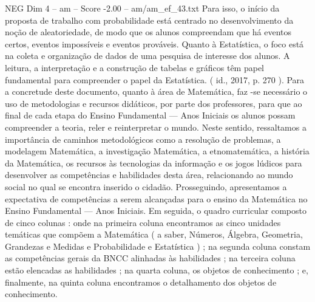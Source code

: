 \begin{textsample}{NEG Dim 4 – am – Score -2.00 – am/am\_ef\_43.txt}
Para isso, o início da proposta de trabalho com probabilidade está centrado no desenvolvimento da noção de aleatoriedade, de modo que os alunos compreendam que há eventos certos, eventos impossíveis e eventos prováveis.
Quanto à Estatística, o foco está na coleta e organização de dados de uma pesquisa de interesse dos alunos.
A leitura, a interpretação e a construção de tabelas e gráficos têm papel fundamental para compreender o papel da Estatística. ( id., 2017, p. 270 ).
Para a concretude deste documento, quanto à área de Matemática, faz -se necessário o uso de metodologias e recursos didáticos, por parte dos professores, para que ao final de cada etapa do Ensino Fundamental — Anos Iniciais os alunos possam compreender a teoria, reler e reinterpretar o mundo.
Neste sentido, ressaltamos a importância de caminhos metodológicos como a resolução de problemas, a modelagem Matemática, a investigação Matemática, a etnomatemática, a história da Matemática, os recursos às tecnologias da informação e os jogos lúdicos para desenvolver as competências e habilidades desta área, relacionando ao mundo social no qual se encontra inserido o cidadão.
Prosseguindo, apresentamos a expectativa de competências a serem alcançadas para o ensino da Matemática no Ensino Fundamental — Anos Iniciais.
Em seguida, o quadro curricular composto de cinco colunas : onde na primeira coluna encontramos as cinco unidades temáticas que compõem a Matemática ( a saber, Números, Álgebra, Geometria, Grandezas e Medidas e Probabilidade e Estatística ) ; na segunda coluna constam as competências gerais da BNCC alinhadas às habilidades ; na terceira coluna estão elencadas as habilidades ; na quarta coluna, os objetos de conhecimento ; e, finalmente, na quinta coluna encontramos o detalhamento dos objetos de conhecimento.

\end{textsample}
